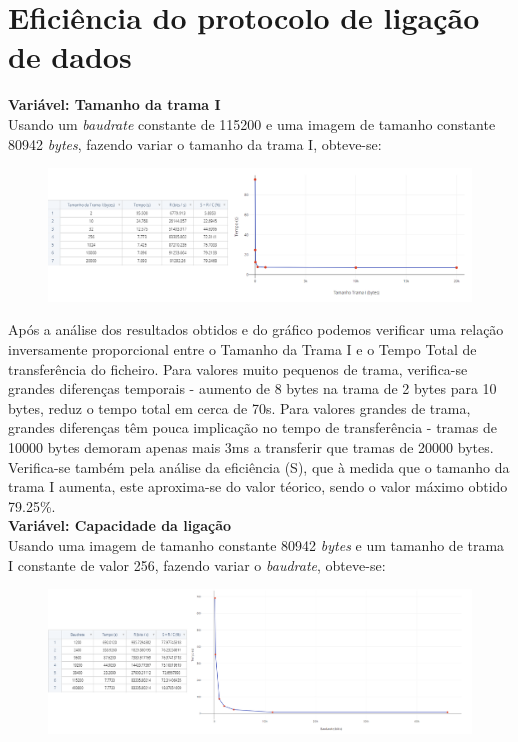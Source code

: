 \documentclass[a4paper, 11pt]{article}
\begin{document}
\section{Eficiência do protocolo de ligação de dados}

\textbf{Variável: Tamanho da trama I}\\
Usando um \textit{baudrate} constante de 115200 e uma imagem de tamanho constante 80942 \textit{bytes}, fazendo variar o tamanho da trama I, obteve-se:
\begin{figure}[h!]
\begin{center}
\includegraphics[scale=0.4]{images/TamanhoTrama.png}
\end{center}
\end{figure}

Após a análise dos resultados obtidos e do gráfico podemos verificar uma relação inversamente proporcional entre o Tamanho da Trama I e o Tempo Total de transferência do ficheiro. Para valores muito pequenos de trama, verifica-se grandes diferenças temporais - aumento de 8 bytes na trama de 2 bytes para 10 bytes, reduz o tempo total em cerca de 70s. Para valores grandes de trama, grandes diferenças têm pouca implicação no tempo de transferência - tramas de 10000 bytes demoram apenas mais  3ms a transferir que tramas de 20000 bytes. Verifica-se também pela análise da eficiência (S), que à medida que o tamanho da trama I aumenta, este aproxima-se do valor téorico, sendo o valor máximo obtido 79.25\%.\\

\textbf{Variável: Capacidade da ligação}\\
Usando uma imagem de tamanho constante 80942 \textit{bytes} e um tamanho de trama I constante de valor 256, fazendo variar o \textit{baudrate}, obteve-se:
\begin{figure}[h!]
\begin{center}
\includegraphics[scale=0.35]{images/Baudrate.png}
\end{center}
\end{figure}
\end{document}

